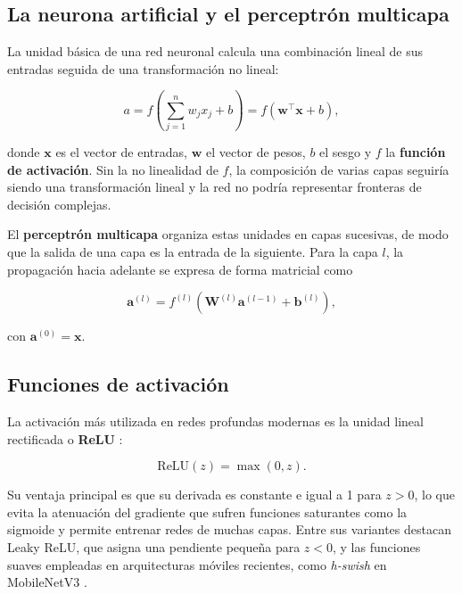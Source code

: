 \subsection{La neurona artificial y el perceptrón multicapa}

La unidad básica de una red neuronal calcula una combinación lineal de sus
entradas seguida de una transformación no lineal:

\begin{equation}
a = f\!\left( \sum_{j=1}^{n} w_{j} x_{j} + b \right) = f(\mathbf{w}^{\top}\mathbf{x} + b),
\label{eq:neurona}
\end{equation}

\noindent donde $\mathbf{x}$ es el vector de entradas, $\mathbf{w}$ el
vector de pesos, $b$ el sesgo y $f$ la \textbf{función de activación}. Sin
la no linealidad de $f$, la composición de varias capas seguiría siendo una
transformación lineal y la red no podría representar fronteras de decisión
complejas.

El \textbf{perceptrón multicapa} organiza estas unidades en capas
sucesivas, de modo que la salida de una capa es la entrada de la siguiente.
Para la capa $l$, la propagación hacia adelante se expresa de forma
matricial como

\begin{equation}
\mathbf{a}^{(l)} = f^{(l)}\!\left( \mathbf{W}^{(l)} \mathbf{a}^{(l-1)} + \mathbf{b}^{(l)} \right),
\label{eq:capa}
\end{equation}

\noindent con $\mathbf{a}^{(0)} = \mathbf{x}$.

\subsection{Funciones de activación}

La activación más utilizada en redes profundas modernas es la unidad lineal
rectificada o \textbf{ReLU} \citep{nair2010}:

\begin{equation}
\mathrm{ReLU}(z) = \max(0, z).
\label{eq:relu}
\end{equation}

Su ventaja principal es que su derivada es constante e igual a 1 para
$z > 0$, lo que evita la atenuación del gradiente que sufren funciones
saturantes como la sigmoide y permite entrenar redes de muchas capas. Entre
sus variantes destacan Leaky ReLU, que asigna una pendiente pequeña para
$z<0$, y las funciones suaves empleadas en arquitecturas móviles recientes,
como \textit{h-swish} en MobileNetV3 \citep{howard2019}.

